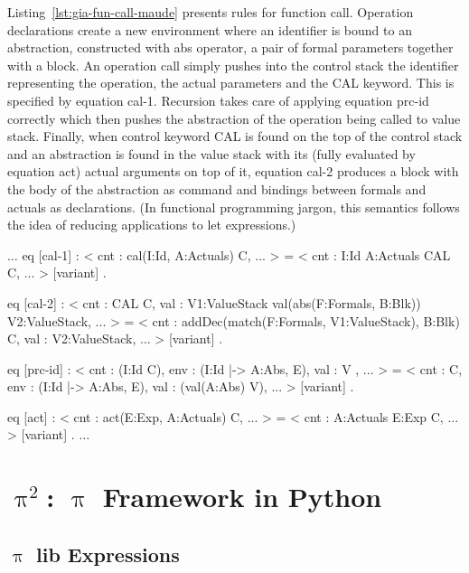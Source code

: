 \documentclass[a4paper,openany]{book}
\begin{document}
Listing~\ref{lst:gia-fun-call-maude} presents rules for function call. Operation declarations create a new environment where an identifier is bound to an abstraction, constructed with abs operator, a pair of formal parameters together with a block. An operation call simply pushes into the control stack the identifier representing the operation, the actual parameters and the CAL keyword. This is specified by equation cal-1. Recursion takes care of applying equation prc-id correctly which then pushes the abstraction of the operation being called to value stack. Finally, when control keyword  CAL is found on the top of the control stack and an abstraction is found in the value stack with its (fully evaluated by equation act) actual arguments on top of it, equation cal-2 produces a block with the body of the abstraction as command and bindings between formals and actuals as declarations. (In functional programming jargon, this semantics follows the idea of reducing applications to let expressions.) 
\begin{maude}[caption=$\uppi$-automaton rules for function call, label=lst:gia-fun-call-maude]
    $\ldots$
    eq [cal-1] :
        < cnt : cal(I:Id, A:Actuals) C, ... > =
        < cnt : I:Id A:Actuals CAL C, ... > [variant] .

    eq [cal-2] :
        < cnt : CAL C,
          val : V1:ValueStack
          val(abs(F:Formals, B:Blk)) V2:ValueStack, ... > =
        < cnt : addDec(match(F:Formals, V1:ValueStack), B:Blk) C,
          val : V2:ValueStack, ... > [variant] .

    eq [prc-id] :
        < cnt : (I:Id C),
          env : (I:Id |-> A:Abs, E),
          val : V , ... > =
        < cnt : C,
          env : (I:Id |-> A:Abs, E),
          val : (val(A:Abs) V), ... > [variant] .

    eq [act] :
        < cnt : act(E:Exp, A:Actuals) C, ... > =
        < cnt : A:Actuals E:Exp C, ... > [variant] .
    $\ldots$
\end{maude}

\chapter{$\uppi^2$: $\uppi$ Framework in Python}\label{pi-framework-in-python}


    \section{$\uppi$ lib Expressions}\label{ux3c0-lib-expressions}
\end{document}
